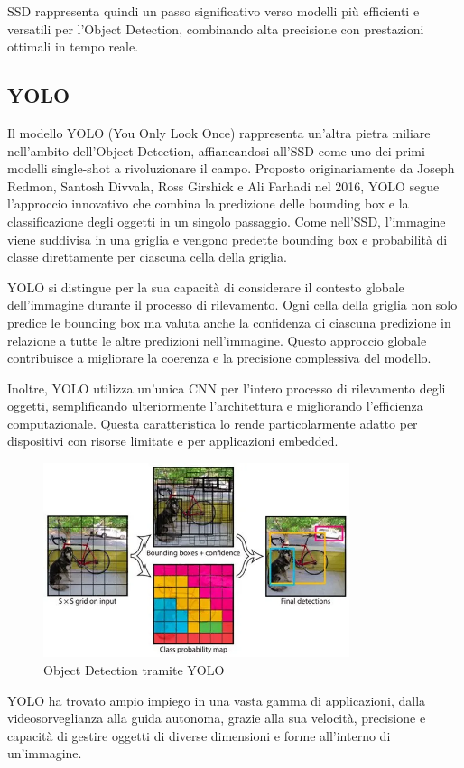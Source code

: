 SSD rappresenta quindi un passo significativo verso modelli più efficienti e versatili per l'Object Detection, combinando alta precisione con prestazioni ottimali in tempo reale.

\subsection{YOLO}
Il modello YOLO (You Only Look Once) rappresenta un'altra pietra miliare nell'ambito dell'Object Detection, affiancandosi all'SSD come uno dei primi modelli single-shot a rivoluzionare il campo. Proposto originariamente da Joseph Redmon, Santosh Divvala, Ross Girshick e Ali Farhadi nel 2016\cite{14}, YOLO segue l'approccio innovativo che combina la predizione delle bounding box e la classificazione degli oggetti in un singolo passaggio. Come nell'SSD, l'immagine viene suddivisa in una griglia e vengono predette bounding box e probabilità di classe direttamente per ciascuna cella della griglia.

YOLO si distingue per la sua capacità di considerare il contesto globale dell'immagine durante il processo di rilevamento. Ogni cella della griglia non solo predice le bounding box ma valuta anche la confidenza di ciascuna predizione in relazione a tutte le altre predizioni nell'immagine. Questo approccio globale contribuisce a migliorare la coerenza e la precisione complessiva del modello.

Inoltre, YOLO utilizza un'unica CNN per l'intero processo di rilevamento degli oggetti, semplificando ulteriormente l'architettura e migliorando l'efficienza computazionale. Questa caratteristica lo rende particolarmente adatto per dispositivi con risorse limitate e per applicazioni embedded.

\begin{figure}[ht]
    \centering
    \includegraphics[width=0.8\textwidth]{files/capitoli/1-object-detection/assets/yolo.png}
    \caption{\label{fig:yolo}Object Detection tramite YOLO\cite{15}}
\end{figure}

YOLO ha trovato ampio impiego in una vasta gamma di applicazioni, dalla videosorveglianza alla guida autonoma, grazie alla sua velocità, precisione e capacità di gestire oggetti di diverse dimensioni e forme all'interno di un'immagine.

\newpage

